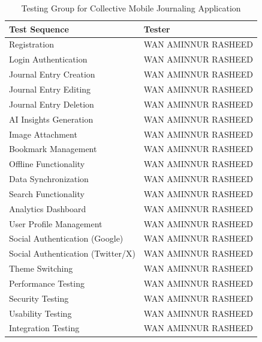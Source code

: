 \begin{table}[H]
\centering
\caption{Testing Group for Collective Mobile Journaling Application}
\label{tab:testing-group}
\begin{tabular}{|p{6cm}|p{8cm}|}
\hline
\textbf{Test Sequence} & \textbf{Tester} \\
\hline
Registration & WAN AMINNUR RASHEED \\
\hline
Login Authentication & WAN AMINNUR RASHEED \\
\hline
Journal Entry Creation & WAN AMINNUR RASHEED \\
\hline
Journal Entry Editing & WAN AMINNUR RASHEED \\
\hline
Journal Entry Deletion & WAN AMINNUR RASHEED \\
\hline
AI Insights Generation & WAN AMINNUR RASHEED \\
\hline
Image Attachment & WAN AMINNUR RASHEED \\
\hline
Bookmark Management & WAN AMINNUR RASHEED \\
\hline
Offline Functionality & WAN AMINNUR RASHEED \\
\hline
Data Synchronization & WAN AMINNUR RASHEED \\
\hline
Search Functionality & WAN AMINNUR RASHEED \\
\hline
Analytics Dashboard & WAN AMINNUR RASHEED \\
\hline
User Profile Management & WAN AMINNUR RASHEED \\
\hline
Social Authentication (Google) & WAN AMINNUR RASHEED \\
\hline
Social Authentication (Twitter/X) & WAN AMINNUR RASHEED \\
\hline
Theme Switching & WAN AMINNUR RASHEED \\
\hline
Performance Testing & WAN AMINNUR RASHEED \\
\hline
Security Testing & WAN AMINNUR RASHEED \\
\hline
Usability Testing & WAN AMINNUR RASHEED \\
\hline
Integration Testing & WAN AMINNUR RASHEED \\
\hline
\end{tabular}
\end{table}